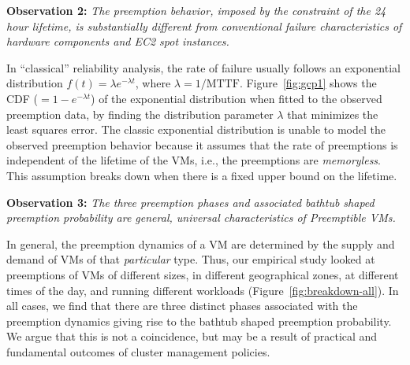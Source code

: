 

\noindent \textbf{Observation 2:} \emph{The preemption behavior, imposed by the constraint of the 24 hour lifetime, is substantially different from conventional failure characteristics of hardware components and EC2 spot instances.}

\noindent In ``classical'' reliability analysis, the rate of failure  usually follows an exponential distribution $f(t) = \lambda e^{-\lambda t}$, where $\lambda=1/\text{MTTF}$.
Figure~\ref{fig:gcp1} shows the CDF ($=1-e^{-\lambda t}$) of the exponential distribution when fitted to the observed preemption data, by finding the distribution parameter $\lambda$ that minimizes the least squares error.
The classic exponential distribution is unable to model the observed preemption behavior because it assumes that the rate of preemptions is independent of the lifetime of the VMs, i.e., the preemptions are \emph{memoryless}.
This assumption breaks down when there is a fixed upper bound on the lifetime. %

\noindent \textbf{Observation 3:} \emph{The three preemption phases and associated bathtub shaped preemption probability are general, universal characteristics of Preemptible VMs.}

In general, the preemption dynamics of a VM are determined by the supply and demand of VMs of that \emph{particular} type.
Thus, our empirical study looked at preemptions of VMs of different sizes, in different geographical zones, at different times of the day, and running different workloads (Figure~\ref{fig:breakdown-all}).
In all cases, we find that there are three distinct phases associated with the preemption dynamics giving rise to the bathtub shaped preemption probability. 
We argue that this is not a coincidence, but may be a result of practical and fundamental outcomes of cluster management policies. 

